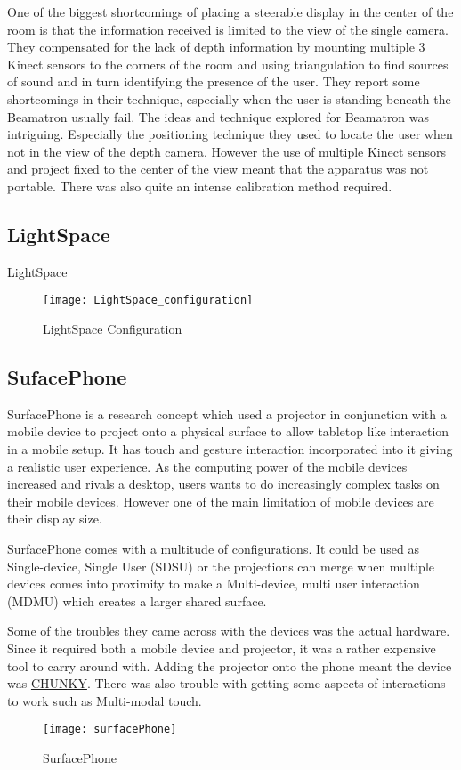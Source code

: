 One of the biggest shortcomings of placing a steerable display in
the center of the room is that the information received is limited
to the view of the single camera. They compensated for the lack of
depth information by mounting multiple 3 Kinect sensors to the corners
of the room and using triangulation to find sources of sound and in
turn identifying the presence of the user. They report some shortcomings
in their technique, especially when the user is standing beneath the
Beamatron usually fail.
The ideas and technique explored for Beamatron was intriguing. Especially
the positioning technique they used to locate the user when not in
the view of the depth camera. However the use of multiple Kinect sensors
and project fixed to the center of the view meant that the apparatus
was not portable. There was also quite an intense calibration method
required.


\subsection{LightSpace}
LightSpace
\begin{figure}[H]
\texttt{[image: LightSpace\_configuration]}

\protect\caption{LightSpace Configuration}
\end{figure}




\subsection{SufacePhone}

SurfacePhone\cite{surfacephone} is a research concept which used
a projector in conjunction with a mobile device to project onto a
physical surface to allow tabletop like interaction in a mobile setup.
It has touch and gesture interaction incorporated into it giving a
realistic user experience. As the computing power of the mobile devices
increased and rivals a desktop, users wants to do increasingly complex
tasks on their mobile devices. However one of the main limitation
of mobile devices are their display size. 

SurfacePhone comes with a multitude of configurations. It could be
used as Single-device, Single User (SDSU) or the projections can merge
when multiple devices comes into proximity to make a Multi-device,
multi user interaction (MDMU) which creates a larger shared surface. 

Some of the troubles they came across with the devices was the actual
hardware. Since it required both a mobile device and projector, it
was a rather expensive tool to carry around with. Adding the projector
onto the phone meant the device was \uline{CHUNKY}. There was also
trouble with getting some aspects of interactions to work such as
Multi-modal touch.
\begin{figure}[H]
\texttt{[image: surfacePhone]}

\protect\caption{SurfacePhone}


\end{figure}

